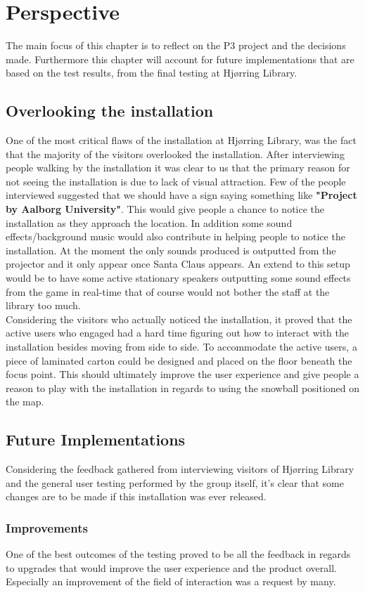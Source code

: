 \chapter{Perspective}
The main focus of this chapter is to reflect on the P3 project and the decisions made. Furthermore this chapter will account for future implementations that are based on the test results, from the final testing at Hj{\o}rring Library.
\section{Overlooking the installation}
One of the most critical flaws of the installation at Hj{\o}rring Library, was the fact that the majority of the visitors overlooked the installation. After interviewing people walking by the installation it was clear to us that the primary reason for not seeing the installation is due to lack of visual attraction. Few of the people interviewed suggested that we should have a sign saying something like \textbf{"Project by Aalborg University"}. This would give people a chance to notice the installation as they approach the location. In addition some sound effects/background music would also contribute in helping people to notice the installation. At the moment the only sounds produced is outputted from the projector and it only appear once Santa Claus appears. An extend to this setup would be to have some active stationary speakers outputting some sound effects from the game in real-time that of course would not bother the staff at the library too much.\\
Considering the visitors who actually noticed the installation, it proved that the active users who engaged had a hard time figuring out how to interact with the installation besides moving from side to side. To accommodate the active users, a piece of laminated carton could be designed and placed on the floor beneath the focus point. This should ultimately improve the user experience and give people a reason to play with the installation in regards to using the snowball positioned on the map.\\
\section{Future Implementations}
Considering the feedback gathered from interviewing visitors of Hj{\o}rring Library and the general user testing performed by the group itself, it's clear that some changes are to be made if this installation was ever released.
\subsection{Improvements}
One of the best outcomes of the testing proved to be all the feedback in regards to upgrades that would improve the user experience and the product overall. Especially an improvement of the field of interaction was a request by many.  
